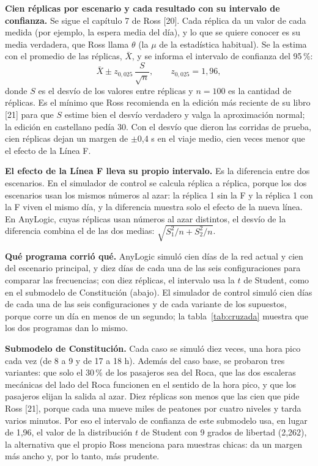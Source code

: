 \documentclass{article}
\begin{document}
\textbf{Cien réplicas por escenario y cada resultado con su intervalo de confianza.} Se sigue el capítulo 7
de Ross [20]. Cada réplica da un valor de cada medida (por ejemplo, la espera media del día), y lo que se
quiere conocer es su media verdadera, que Ross llama $\theta$ (la $\mu$ de la estadística habitual). Se la
estima con el promedio de las réplicas, $\bar{X}$, y se informa el intervalo de confianza del 95\,\%:
\[
  \bar{X} \pm z_{0{,}025}\,\frac{S}{\sqrt{n}}, \qquad z_{0{,}025} = 1{,}96,
\]
donde $S$ es el desvío de los valores entre réplicas y $n = 100$ es la cantidad de réplicas. Es el mínimo que
Ross recomienda en la edición más reciente de su libro [21] para que $S$ estime bien el desvío verdadero y
valga la aproximación normal; la edición en castellano pedía 30. Con el desvío que dieron las corridas de
prueba, cien réplicas dejan un margen de $\pm$0,4 s en el viaje medio, cien veces menor que el efecto de la
Línea F.

\textbf{El efecto de la Línea F lleva su propio intervalo.} Es la diferencia entre dos escenarios. En el
simulador de control se calcula réplica a réplica, porque los dos escenarios usan los mismos números al azar:
la réplica 1 sin la F y la réplica 1 con la F viven el mismo día, y la diferencia muestra solo el efecto de
la nueva línea. En AnyLogic, cuyas réplicas usan números al azar distintos, el desvío de la diferencia
combina el de las dos medias: $\sqrt{S_1^2/n + S_2^2/n}$.

\textbf{Qué programa corrió qué.} AnyLogic simuló cien días de la red actual y cien del escenario principal,
y diez días de cada una de las seis configuraciones para comparar las frecuencias; con diez réplicas, el
intervalo usa la $t$ de Student, como en el submodelo de Constitución (abajo). El simulador de control
simuló cien días de cada una de las seis configuraciones y de cada variante de los supuestos, porque corre un
día en menos de un segundo; la tabla~\ref{tab:cruzada} muestra que los dos programas dan lo mismo.

\textbf{Submodelo de Constitución.} Cada caso se simuló diez veces, una hora pico cada vez (de 8 a 9 y de 17
a 18 h). Además del caso base, se probaron tres variantes: que solo el 30\,\% de los pasajeros sea del Roca,
que las dos escaleras mecánicas del lado del Roca funcionen en el sentido de la hora pico, y que los
pasajeros elijan la salida al azar. Diez réplicas son menos que las cien que pide Ross [21], porque cada una
mueve miles de peatones por cuatro niveles y tarda varios minutos. Por eso el intervalo de confianza de este
submodelo usa, en lugar de 1,96, el valor de la distribución $t$ de Student con 9 grados de libertad
(2,262), la alternativa que el propio Ross menciona para muestras chicas: da un margen más ancho y, por lo
tanto, más prudente.
\end{document}
